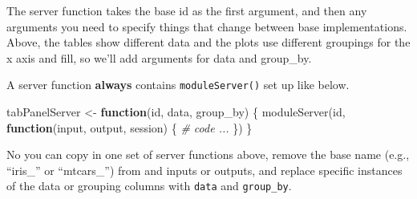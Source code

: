 \documentclass[
  oneside]{book}
\newenvironment{Shaded}{\begin{snugshade}}{\end{snugshade}}
\newcommand{\AttributeTok}[1]{\textcolor[rgb]{0.77,0.63,0.00}{#1}}
\newcommand{\CommentTok}[1]{\textcolor[rgb]{0.56,0.35,0.01}{\textit{#1}}}
\newcommand{\ConstantTok}[1]{\textcolor[rgb]{0.00,0.00,0.00}{#1}}
\newcommand{\ControlFlowTok}[1]{\textcolor[rgb]{0.13,0.29,0.53}{\textbf{#1}}}
\newcommand{\FloatTok}[1]{\textcolor[rgb]{0.00,0.00,0.81}{#1}}
\newcommand{\FunctionTok}[1]{\textcolor[rgb]{0.00,0.00,0.00}{#1}}
\newcommand{\NormalTok}[1]{#1}
\newcommand{\OtherTok}[1]{\textcolor[rgb]{0.56,0.35,0.01}{#1}}
\newcommand{\SpecialCharTok}[1]{\textcolor[rgb]{0.00,0.00,0.00}{#1}}
\begin{document}
The server function takes the base id as the first argument, and then any arguments you need to specify things that change between base implementations. Above, the tables show different data and the plots use different groupings for the x axis and fill, so we'll add arguments for \AttributeTok{data} and \AttributeTok{group\_by}.

A server function \textbf{always} contains \texttt{moduleServer()} set up like below.

\begin{Shaded}
\begin{Highlighting}[]
\NormalTok{tabPanelServer }\OtherTok{\textless{}{-}} \ControlFlowTok{function}\NormalTok{(id, data, group\_by) \{}
    \FunctionTok{moduleServer}\NormalTok{(id, }\ControlFlowTok{function}\NormalTok{(input, output, session) \{}
      \CommentTok{\# code ...}
\NormalTok{    \})}
\NormalTok{\}}
\end{Highlighting}
\end{Shaded}

No you can copy in one set of server functions above, remove the base name (e.g., ``iris\_'' or ``mtcars\_'') from and inputs or outputs, and replace specific instances of the data or grouping columns with \texttt{data} and \texttt{group\_by}.

\begin{Shaded}
\end{Shaded}
\end{document}
